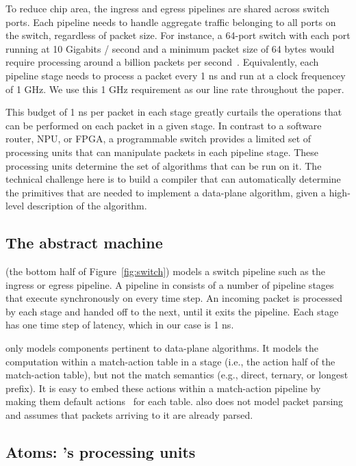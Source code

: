 To reduce chip area, the ingress and egress pipelines are shared across switch
ports.  Each pipeline needs to handle aggregate traffic belonging to all ports
on the switch, regardless of packet size. For instance, a 64-port switch with
each port running at 10 Gigabits / second and a minimum packet size of 64 bytes
would require processing around a billion packets per second~\cite{rmt}.
Equivalently, each pipeline stage needs to process a packet every 1 ns and run
at a clock frequencey of 1 GHz. We use this 1 GHz requirement as our line rate
throughout the paper.

This budget of 1 ns per packet in each stage greatly curtails the operations
that can be performed on each packet in a given stage. In contrast to a
software router, NPU, or FPGA, a programmable switch provides a limited set of
processing units that can manipulate packets in each pipeline stage. These
processing units determine the set of algorithms that can be run on it. The
technical challenge here is to build a compiler that can automatically
determine the primitives that are needed to implement a data-plane algorithm,
given a high-level description of the algorithm.

\subsection{The \absmachine abstract machine}

\absmachine (the bottom half of Figure~\ref{fig:switch}) models a switch
pipeline such as the ingress or egress pipeline. A pipeline in \absmachine
consists of a number of pipeline stages that execute synchronously on every
time step. An incoming packet is processed by each stage and handed off to the
next, until it exits the pipeline. Each stage has one time step of latency,
which in our case is 1 ns.

\absmachine only models components pertinent to data-plane algorithms. It
models the computation within a match-action table in a stage (i.e., the action
half of the match-action table), but not the match semantics (e.g., direct,
ternary, or longest prefix). It is easy to embed these actions within a
match-action pipeline by making them default actions~\cite{p4spec} for each
table. \absmachine also does not model packet parsing and assumes that packets
arriving to it are already parsed.

\subsection{Atoms: \absmachine's processing units}

